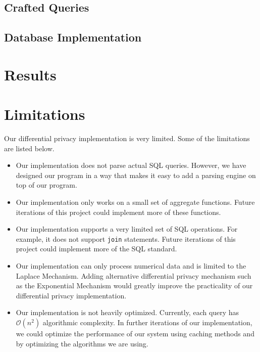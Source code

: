 \documentclass[conference,11pt]{IEEEtran}
\begin{document}
\subsection{Crafted Queries}\label{sec:crafted-queries}
\subsection{Database Implementation}\label{sec:db-impl}

\section{Results}\label{sec:results}

\section{Limitations}\label{sec:limitations}
Our differential privacy implementation is very limited. Some of the limitations
are listed below.
\begin{itemize}
    \item Our implementation does not parse actual SQL queries. However, we
        have designed our program in a way that makes it easy to add a parsing
        engine on top of our program.
    \item Our implementation only works on a small set of aggregate functions.
        Future iterations of this project could implement more of these
        functions.
    \item Our implementation supports a very limited set of SQL operations. For
        example, it does not support \texttt{join} statements.  Future
        iterations of this project could implement more of the SQL standard.
    \item Our implementation can only process numerical data and is limited to
        the Laplace Mechanism. Adding alternative differential privacy mechanism
        such as the Exponential Mechanism would greatly improve the practicality
        of our differential privacy implementation.
    \item Our implementation is not heavily optimized. Currently, each query has
        $\mathcal{O}(n^2)$ algorithmic complexity. In further iterations of our
        implementation, we could optimize the performance of our system using
        caching methods and by optimizing the algorithms we are using.
\end{itemize}
\end{document}
